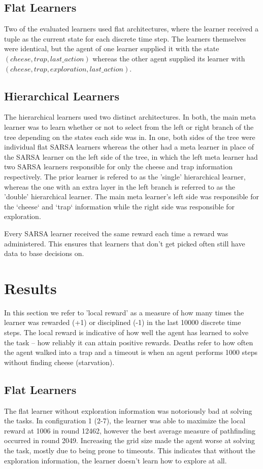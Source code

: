 \documentclass{article}
\begin{document}
	\subsection{Flat Learners}
	\label{s:met:flat}
	Two of the evaluated learners used flat architectures, where the learner received a tuple as the current state for each discrete time step. The learners themselves were identical, but the agent of one learner supplied it with the state $(cheese, trap, last\_action)$ whereas the other agent supplied its learner with $(cheese, trap, exploration, last\_action)$. 

	\subsection{Hierarchical Learners}
	\label{s:met:meta}
	The hierarchical learners used two distinct architectures. In both, the main meta learner was to learn whether or not to select from the left or right branch of the tree depending on the states each side was in. In one, both sides of the tree were individual flat SARSA learners whereas the other had a meta learner in place of the SARSA learner on the left side of the tree, in which the left meta learner had two SARSA learners responsible for only the cheese and trap information respectively.
	The prior learner is refered to as the 'single' hierarchical learner, whereas the one with an extra layer in the left branch is referred to as the 'double' hierarchical learner.
	The main meta learner's left side was responsible for the `cheese` and `trap` information while the right side was responsible for exploration. 

	Every SARSA learner received the same reward each time a reward was administered. This ensures that learners that don't get picked often still have data to base decisions on.

	\section{Results}
	\label{sec:results}
	In this section we refer to 'local reward' as a measure of how many times the learner was rewarded (+1) or disciplined (-1) in the last 10000 discrete time steps. The local reward is indicative of how well the agent has learned to solve the task -- how reliably it can attain positive rewards.
	Deaths refer to how often the agent walked into a trap and a timeout is when an agent performs 1000 steps without finding cheese (starvation).

	\subsection{Flat Learners}
	\label{s:res:flat}
	The flat learner without exploration information was notoriously bad at solving the tasks. In configuration 1 (2-7), the learner was able to maximize the local reward at 1006 in round 12462, however the best average measure of pathfinding occurred in round 2049. Increasing the grid size made the agent worse at solving the task, mostly due to being prone to timeouts. This indicates that without the exploration information, the learner doesn't learn how to explore at all. 
\end{document}
